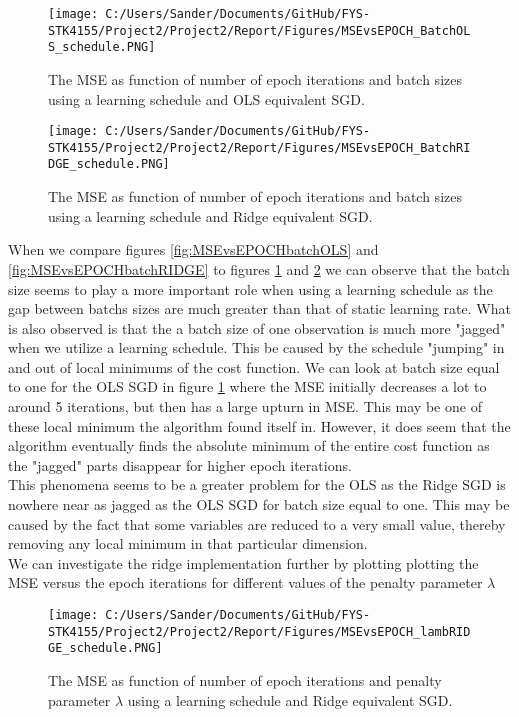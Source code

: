 \documentclass[12pt,a4paper]{article}
\begin{document}
\begin{figure}[H]
\centering
\texttt{[image: C:/Users/Sander/Documents/GitHub/FYS-STK4155/Project2/Project2/Report/Figures/MSEvsEPOCH\_BatchOLS\_schedule.PNG]}
\caption{\label{fig:MSEvsEPOCHbatchOLS_sch} The MSE as function of number of epoch iterations and batch sizes using a learning schedule and OLS equivalent SGD.}
\end{figure}

\begin{figure}[H]
\centering
\texttt{[image: C:/Users/Sander/Documents/GitHub/FYS-STK4155/Project2/Project2/Report/Figures/MSEvsEPOCH\_BatchRIDGE\_schedule.PNG]}
\caption{\label{fig:MSEvsEPOCHbatchRIDGE_sch} The MSE as function of number of epoch iterations and batch sizes using a learning schedule and Ridge equivalent SGD.}
\end{figure}

\noindent When we compare figures \ref{fig:MSEvsEPOCHbatchOLS} and \ref{fig:MSEvsEPOCHbatchRIDGE} to figures \ref{fig:MSEvsEPOCHbatchOLS_sch} and \ref{fig:MSEvsEPOCHbatchRIDGE_sch} we can observe that the batch size seems to play a more important role when using a learning schedule as the gap between batchs sizes are much greater than that of static learning rate. What is also observed is that the a batch size of one observation is much more "jagged" when we utilize a learning schedule. This be caused by the schedule "jumping" in and out of local minimums of the cost function. We can look at batch size equal to one for the OLS SGD in figure \ref{fig:MSEvsEPOCHbatchOLS_sch} where the MSE initially decreases a lot to around 5 iterations, but then has a large upturn in MSE. This may be one of these local minimum the algorithm found itself in. However, it does seem that the algorithm eventually finds the absolute minimum of the entire cost function as the "jagged" parts disappear for higher epoch iterations. 
\\
This phenomena seems to be a greater problem for the OLS as the Ridge SGD is nowhere near as jagged as the OLS SGD for batch size equal to one. This may be caused by the fact that some variables are reduced to a very small value, thereby removing any local minimum in that particular dimension.
\\
We can investigate the ridge implementation further by plotting plotting the MSE versus the epoch iterations for different values of the penalty parameter $\lambda$

\begin{figure}[H]
\centering
\texttt{[image: C:/Users/Sander/Documents/GitHub/FYS-STK4155/Project2/Project2/Report/Figures/MSEvsEPOCH\_lambRIDGE\_schedule.PNG]}
\caption{\label{fig:MSEvsEPOCHlambRIDGE_sch} The MSE as function of number of epoch iterations and penalty parameter $\lambda$ using a learning schedule and Ridge equivalent SGD.}
\end{figure}
\end{document}
